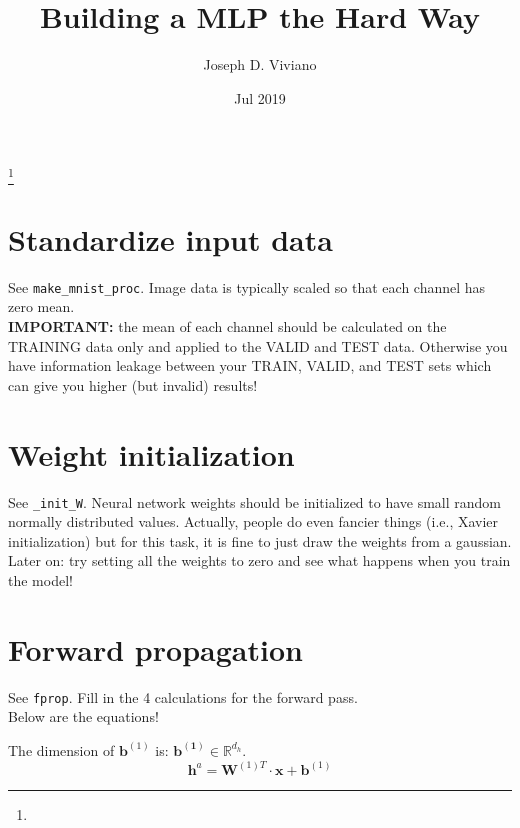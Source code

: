 \documentclass[reqno]{amsart}
\theoremstyle{definition}
\theoremstyle{remark}
\numberwithin{equation}{section}
\begin{document}
\title{Building a MLP the Hard Way}

\author{Joseph D. Viviano}
\address{Universit\'e de Montr\'eal}
\curraddr{}
\thanks{}
\date{Jul 2019}

\maketitle

\section{Standardize input data}

See \texttt{make\_mnist\_proc}. Image data is typically scaled so that each
channel has zero mean. \\

\textbf{IMPORTANT:} the mean of each channel should be calculated on the
TRAINING data only and applied to the VALID and TEST data. Otherwise you have
information leakage between your TRAIN, VALID, and TEST sets which can give
you higher (but invalid) results!

\section{Weight initialization}

See \texttt{\_init\_W}. Neural network weights should be initialized to have small
random normally distributed values. Actually, people do even fancier things
(i.e., Xavier initialization) but for this task, it is fine to just draw the
weights from a gaussian. \\

Later on: try setting all the weights to zero and see what happens when you
train the model!

\section{Forward propagation}

See \texttt{fprop}. Fill in the 4 calculations for the forward pass. \\

Below are the equations!

The dimension of $\mathbf{b}^{(1)}$ is: $\mathbf{b^{(1)}} \in \mathbb{R}^{d_h}$. \\

\begin{equation}
    \mathbf{h}^a = \mathbf{W}^{(1)T} \cdot \mathbf{x} + \mathbf{b}^{(1)}
\end{equation}
\end{document}
